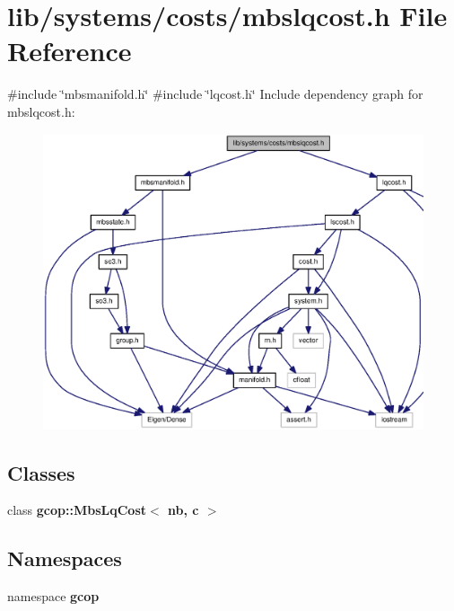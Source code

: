 \section{lib/systems/costs/mbslqcost.h \-File \-Reference}
\label{mbslqcost_8h}
{\ttfamily \#include \char`\"{}mbsmanifold.\-h\char`\"{}}\*
{\ttfamily \#include \char`\"{}lqcost.\-h\char`\"{}}\*
\-Include dependency graph for mbslqcost.\-h\-:
\nopagebreak
\begin{figure}[H]
\begin{center}
\leavevmode
\includegraphics[width=350pt]{mbslqcost_8h__incl}
\end{center}
\end{figure}
\subsection*{\-Classes}
\begin{DoxyCompactItemize}
\item 
class {\bf gcop\-::\-Mbs\-Lq\-Cost$<$ nb, c $>$}
\end{DoxyCompactItemize}
\subsection*{\-Namespaces}
\begin{DoxyCompactItemize}
\item 
namespace {\bf gcop}
\end{DoxyCompactItemize}
